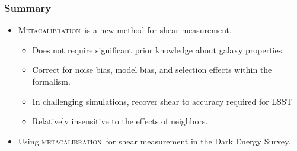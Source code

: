 \documentclass{beamer}
\newcommand{\mcal}{\textsc{metacalibration}}
\newcommand{\Mcal}{\textsc{Metacalibration}}
\begin{document}
\frame
{
    \frametitle{Summary}
    \begin{itemize}
        \item \Mcal\ is a new method for shear measurement.
            \begin{itemize}
                \item Does not require significant prior knowledge about galaxy properties.
                \item Correct for noise bias, model bias, and selection effects within 
                    the formalism.

                \item In challenging simulations, recover shear to accuracy required
                    for LSST

                \item Relatively insensitive to the effects of neighbors.

            \end{itemize}

        \item Using \mcal\ for shear measurement in the Dark Energy Survey.

    \end{itemize}
}
\end{document}
